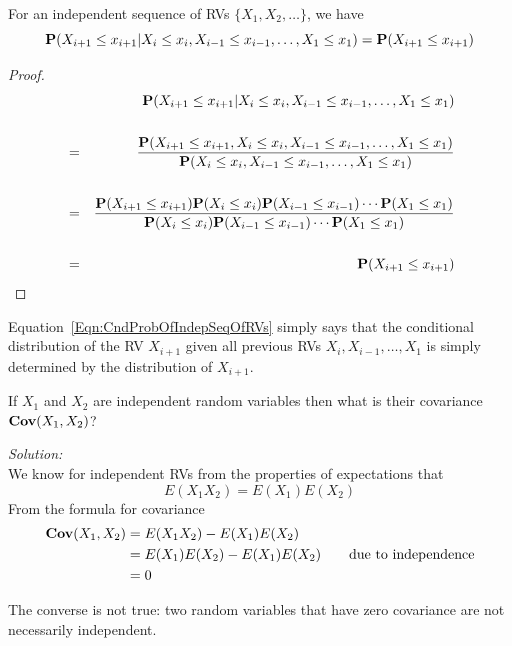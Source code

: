 \begin{prop}
For an independent sequence of RVs $\{X_1,X_2,\ldots\}$, we have
\begin{equation}\label{Eqn:CndProbOfIndepSeqOfRVs}
\mathbf{P}(X_{i+1} \leq x_{i+1} | X_{i} \leq x_{i}, X_{i-1} \leq x_{i-1}, \ldots, X_1 \leq x_1) =  \mathbf{P}(X_{i+1} \leq x_{i+1}) 
\end{equation}
\end{prop}
\begin{proof}
\begin{eqnarray}
&&\mathbf{P}(X_{i+1} \leq x_{i+1} | X_{i} \leq x_{i}, X_{i-1} \leq x_{i-1}, \ldots, X_1 \leq x_1) \notag\\
\notag \\
&=& \frac{\mathbf{P}(X_{i+1} \leq x_{i+1}, X_{i} \leq x_{i}, X_{i-1} \leq x_{i-1}, \ldots, X_1 \leq x_1)}{\mathbf{P}(X_{i} \leq x_{i}, X_{i-1} \leq x_{i-1}, \ldots, X_1 \leq x_1)} \notag \\
\notag \\
&=& \frac{\mathbf{P}(X_{i+1} \leq x_{i+1}) \mathbf{P}(X_{i} \leq x_{i}) \mathbf{P}(X_{i-1} \leq x_{i-1}) \cdots \mathbf{P}(X_1 \leq x_1)}{\mathbf{P}(X_{i} \leq x_{i}) \mathbf{P}(X_{i-1} \leq x_{i-1}) \cdots \mathbf{P}(X_1 \leq x_1)} \notag \\
\notag \\
&=& \mathbf{P}(X_{i+1} \leq x_{i+1}) \notag 
\end{eqnarray}
\end{proof}
Equation~\eqref{Eqn:CndProbOfIndepSeqOfRVs} simply says that the conditional distribution of the RV $X_{i+1}$ given all previous RVs $X_i,X_{i-1},\ldots,X_1$ is simply determined by the distribution of $X_{i+1}$.

\begin{example}\label{EgCovOf2IndepRVs}
If $X_1$ and $X_2$ are independent random variables then what is their covariance $\mathbf{Cov}(X_1,X_2)$?

{\em Solution:}\\[4pt]
We know for independent RVs from the properties of expectations that
\[
E(X_1X_2) = E(X_1)E(X_2)
\]
From the formula for covariance
\begin{align*}
\mathbf{Cov} (X_1,X_2) 
&= E(X_1 X_2)-E(X_1)E(X_2)\\
&= E(X_1) E(X_2)-E(X_1)E(X_2) \qquad \text{due to independence}\\
&= 0
\end{align*}
\end{example}

\begin{rem}
The converse is not true: two random variables that have zero covariance are not necessarily independent.
\end{rem}

